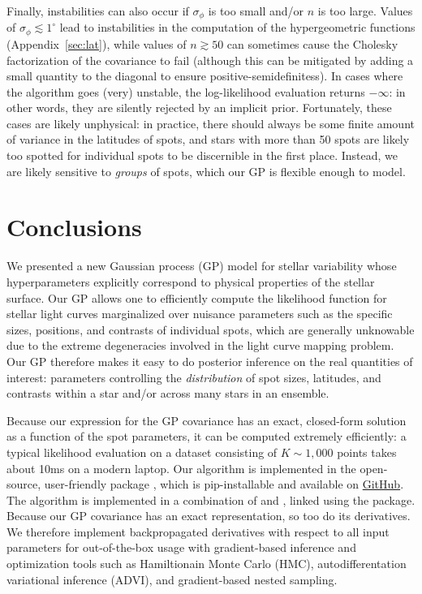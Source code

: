 \documentclass[modern]{aastex62}
\begin{document}
Finally, instabilities can also occur if $\sigma_\phi$ is too small and/or
$n$ is too large. Values of $\sigma_\phi \lesssim 1^\circ$ lead to instabilities
in the computation of the hypergeometric functions (Appendix~\ref{sec:lat}),
while values of $n \gtrsim 50$ can sometimes cause the Cholesky factorization
of the covariance to fail (although this can be mitigated by adding a small
quantity to the diagonal to ensure positive-semidefinitess). In cases where
the algorithm goes (very) unstable, the log-likelihood evaluation returns
$-\infty$: in other words, they are silently rejected by an implicit prior.
Fortunately, these cases are likely unphysical: in practice, there should always be some
finite amount of variance in the latitudes of spots, and stars with more than
50 spots are likely too spotted for individual spots to be discernible in the
first place. Instead, we are likely sensitive to \emph{groups} of spots, which
our GP is flexible enough to model.

\section{Conclusions}
\label{sec:conclusions}
We presented a new Gaussian process (GP) model for stellar variability
whose hyperparameters explicitly correspond to physical properties of the stellar
surface. Our GP allows one to efficiently compute the likelihood function
for stellar light curves
marginalized over nuisance parameters such as the specific sizes,
positions, and contrasts of individual spots,
which are generally unknowable due to the extreme degeneracies
involved in the light curve mapping problem. Our GP therefore
makes it easy to
do posterior inference on the real quantities of interest: parameters
controlling the \emph{distribution} of spot sizes, latitudes, and
contrasts within a star and/or across many stars in an ensemble.

Because our expression for the GP covariance has an exact, closed-form
solution as a function of the spot parameters, it can be computed
extremely efficiently: a typical likelihood evaluation on a dataset
consisting of $K \sim 1{,}000$ points takes about 10ms on a modern
laptop. Our algorithm is implemented in the open-source, user-friendly
\Python package \starryprocess, which is \textsf{pip}-installable and available on
\href{https://github.com/rodluger/starry_process}{GitHub}.
The algorithm is implemented in a combination of \cpp and \Python,
linked using the \theano package. Because our GP covariance has an exact
representation, so too do its derivatives. We therefore implement
backpropagated derivatives with respect to all input parameters for
out-of-the-box usage with gradient-based inference and optimization
tools such as Hamiltionain Monte Carlo (HMC), autodifferentation
variational inference (ADVI), and gradient-based nested sampling.
\end{document}
